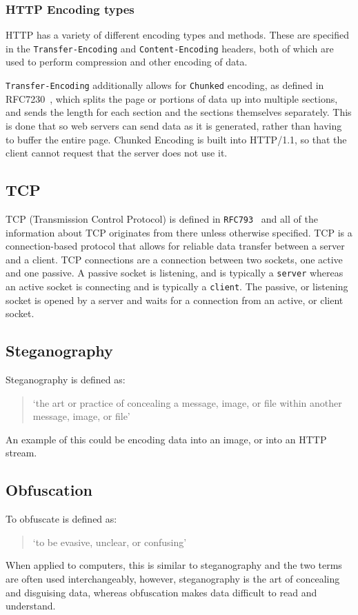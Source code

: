 \subsubsection{HTTP Encoding types}
HTTP has a variety of different encoding types and methods.
These are specified in the \texttt{Transfer-Encoding} and \texttt{Content-Encoding} headers, both of which are  used to perform compression and other encoding of data.\par
\texttt{Transfer-Encoding} additionally allows for \texttt{Chunked} encoding, as defined in\\ RFC7230~\cite{rfc7230}, which splits the page or portions of data up into multiple sections, and sends the length for each section and the sections themselves separately. This is done that so web servers can send data as it is generated, rather than having to buffer the entire page. Chunked Encoding is built into HTTP/1.1, so that the client cannot request that the server does not use it.

\subsection{TCP}
TCP (Transmission Control Protocol) is defined in \texttt{RFC793}~\cite{rfc793} and all of the information about TCP originates from there unless otherwise specified.
TCP is a connection-based protocol that allows for reliable data transfer between a server and a client.
TCP connections are a connection between two sockets, one active and one passive.
A passive socket is listening, and is typically a \texttt{server} whereas an active socket is connecting and is typically a \texttt{client}.
The passive, or listening socket is opened by a server and waits for a connection from an active, or client socket.

\subsection{Steganography}
Steganography is defined as:
\begin{quotation}
    `the art or practice of concealing a message, image, or file within
    another message, image, or file'~\cite{dictsteno}
\end{quotation}
An example of this could be encoding data into an image, or into an HTTP stream.

\subsection{Obfuscation}
To obfuscate is defined as:
\begin{quotation}
    `to be evasive, unclear, or confusing'~\cite{dictobfs}
\end{quotation}
When applied to computers, this is similar to steganography and the two terms are often used interchangeably, however, steganography is the art of concealing and disguising data, whereas obfuscation makes data difficult to read and understand. 

